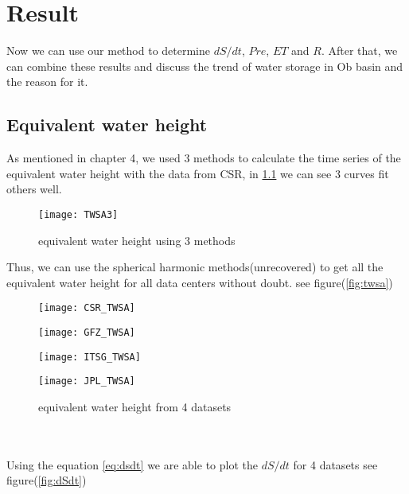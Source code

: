 \chapter{Result}
Now we can use our method to determine $dS/dt$, $Pre$, $ET$ and $R$. After that, we can combine these results and discuss the trend of water storage in Ob basin and the reason for it.
\section{Equivalent water height}
As mentioned in chapter 4, we used 3 methods to calculate the time series of the equivalent water height with the data from CSR, in \ref{fig:TWSA3} we can see 3 curves fit others well. 
\begin{figure}[htbp]
	\centering
	\texttt{[image: TWSA3]} %
	\caption{equivalent water height using 3 methods} 
	\label{fig:TWSA3}
\end{figure}
Thus, we can use the spherical harmonic methods(unrecovered) to get all the equivalent water height for all data centers without doubt. see figure(\ref{fig:twsa})
\begin{figure}[htbp] \label{fig:twsa}
	\centering
	\begin{minipage}[t]{0.45\textwidth}
		\centering
		\texttt{[image: CSR\_TWSA]} %
		\label{fig:CSR}
	\end{minipage}
	\begin{minipage}[t]{0.45\textwidth}
		\centering
		\texttt{[image: GFZ\_TWSA]} %
		\label{fig:GFZ}
	\end{minipage}
	\begin{minipage}[t]{0.45\textwidth}
		\centering
		\texttt{[image: ITSG\_TWSA]} %
		\label{fig:ITSG}
	\end{minipage}
	\begin{minipage}[t]{0.45\textwidth}
		\centering
		\texttt{[image: JPL\_TWSA]} %
		\label{fig:JPL}
	\end{minipage}
	\caption{equivalent water height from 4 datasets}
\end{figure}
\\\\
Using the equation \ref{eq:dsdt} we are able to plot the $dS / dt$ for 4 datasets see figure(\ref{fig:dSdt})

